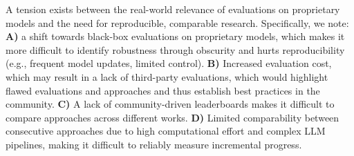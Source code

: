 




A tension exists between the real-world relevance of evaluations on proprietary models and the need for reproducible, comparable research. Specifically, we note: \textbf{A)} a shift towards black-box evaluations on proprietary models, which makes it more difficult to identify robustness through obscurity and hurts reproducibility (e.g., frequent model updates, limited control). \textbf{B)} Increased evaluation cost, which may result in a lack of third-party evaluations, which would highlight flawed evaluations and approaches and thus establish best practices in the community. \textbf{C)} A lack of community-driven leaderboards makes it difficult to compare approaches across different works. \textbf{D)} Limited comparability between consecutive approaches due to high computational effort and complex LLM pipelines, making it difficult to reliably measure incremental progress.

